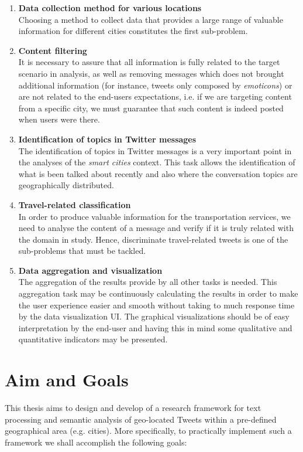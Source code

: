 \begin{enumerate}
	\item \textbf{Data collection method for various locations}\\Choosing a method to collect data that provides a large range of valuable information for different cities constitutes the first sub-problem.
	
	\item \textbf{Content filtering}\\It is necessary to assure that all information is fully related to the target scenario in analysis, as well as removing messages which does not brought additional information (for instance, tweets only composed by \textit{emoticons}) or are not related to the end-users expectations, i.e. if we are targeting content from a specific city, we must guarantee that such content is indeed posted when users were there.
	
	\item \textbf{Identification of topics in Twitter messages}\\The identification of topics in Twitter messages is a very important point in the analyses of the \textit{smart cities} context. This task allows the identification of what is been talked about recently and also where the conversation topics are geographically distributed.
	
	\item \textbf{Travel-related classification}\\In order to produce valuable information for the transportation services, we need to analyse the content of a message and verify if it is truly related with the domain in study. Hence, discriminate travel-related tweets is one of the sub-problems that must be tackled.
	
	\item \textbf{Data aggregation and visualization}\\The aggregation of the results provide by all other tasks is needed. This aggregation task may be continuously calculating the results in order to make the user experience easier and smooth without taking to much response time by the data visualization \gls{UI}. The graphical visualizations should be of easy interpretation by the end-user and having this in mind some qualitative and quantitative indicators may be presented.
\end{enumerate}
\fi

\section{Aim and Goals}\label{sec:aim_goals}
This thesis aims to design and develop of a research framework for text processing and semantic analysis of geo-located Tweets within a pre-defined geographical area (e.g. cities). More specifically, to practically implement such a framework we shall accomplish the following goals: 

